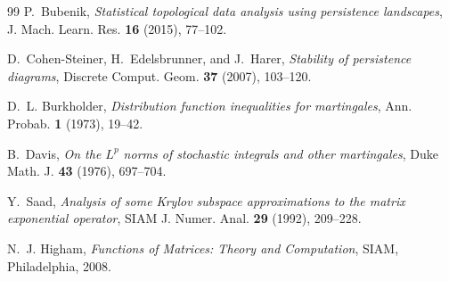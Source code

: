\documentclass[11pt,a4paper,reqno]{article}
\theoremstyle{plain}
\theoremstyle{definition}
\theoremstyle{remark}
\numberwithin{equation}{section}
\begin{document}
\begin{thebibliography}{99}
P.~Bubenik,
\emph{Statistical topological data analysis using persistence landscapes},
J. Mach. Learn. Res. \textbf{16} (2015), 77--102.

D.~Cohen-Steiner, H.~Edelsbrunner, and J.~Harer,
\emph{Stability of persistence diagrams},
Discrete Comput. Geom. \textbf{37} (2007), 103--120.

D.~L. Burkholder,
\emph{Distribution function inequalities for martingales},
Ann. Probab. \textbf{1} (1973), 19--42.

B.~Davis,
\emph{On the $L^p$ norms of stochastic integrals and other martingales},
Duke Math. J. \textbf{43} (1976), 697--704.

Y.~Saad,
\emph{Analysis of some Krylov subspace approximations to the matrix exponential operator},
SIAM J. Numer. Anal. \textbf{29} (1992), 209--228.

N.~J. Higham,
\emph{Functions of Matrices: Theory and Computation},
SIAM, Philadelphia, 2008.

\end{thebibliography}
\end{document}
